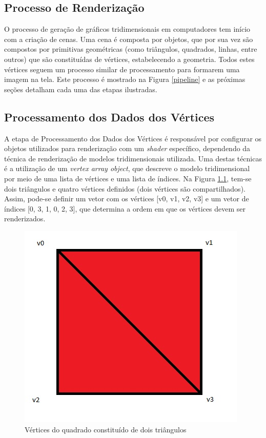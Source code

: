 \begin{anexosenv}

\partanexos

\chapter{Processo de Renderização}
\label{renderpipe}


	O processo de geração de gráficos tridimensionais em computadores tem início com a criação de cenas. Uma cena é composta por objetos, que por sua vez são compostos por primitivas geométricas (como triângulos, quadrados, linhas, entre outros) que são constituídas de vértices, estabelecendo a geometria. Todos estes vértices seguem um processo similar de processamento para formarem uma imagem na tela.  Este processo é mostrado na Figura \ref{pipeline} e as próximas seções detalham cada uma das etapas ilustradas. 

	
\section{Processamento dos Dados dos Vértices}

	A etapa de Processamento dos Dados dos Vértices é responsável por configurar os objetos utilizados para renderização com um \textit{shader} específico, dependendo da técnica de renderização de modelos tridimensionais utilizada. Uma destas técnicas é a utilização de um \textit{vertex array object}, que descreve o modelo tridimensional por meio de uma lista de vértices e uma lista de índices. Na Figura \ref{quadrado}, tem-se dois triângulos e quatro vértices definidos (dois vértices são compartilhados). Assim, pode-se definir um vetor com os vértices [v0, v1, v2, v3] e um vetor de índices [0, 3, 1, 0, 2, 3], que determina a ordem em que os vértices devem ser renderizados. 

	\begin{figure}[h]
	\centering
		\includegraphics[keepaspectratio=true,scale=0.5]{figuras/quadrado.jpg}
	\caption{Vértices do quadrado constituído de dois triângulos}
	\label{quadrado}
	\end{figure}


\end{anexosenv}
